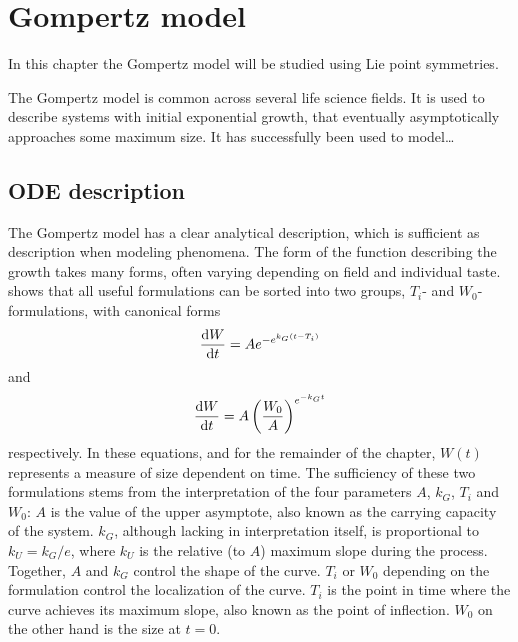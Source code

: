 \chapter{Gompertz model}

In this chapter the Gompertz model will be studied using Lie point symmetries.

The Gompertz model is common across several life science fields.
It is used to describe systems with initial exponential growth, that eventually asymptotically approaches some maximum size.
It has successfully been used to model\dots

\section{ODE description}

The Gompertz model has a clear analytical description, which is sufficient as description when modeling phenomena.
The form of the function describing the growth takes many forms, often varying depending on field and individual taste.
\cite{tjorve2017gompertz} shows that all useful formulations can be sorted into two groups, \(T_i\)- and \(W_0\)-formulations, with canonical forms
\begin{equation}
  \dv{W}{t} = A e^{-e^{k_G(t-T_i)}}
\end{equation}
and
\begin{equation}
  \dv{W}{t} = A \left(\frac{W_0}{A}\right)^{e^{-k_G t}}
\end{equation}
respectively.
In these equations, and for the remainder of the chapter, \(W(t)\) represents a measure of size dependent on time.
The sufficiency of these two formulations stems from the interpretation of the four parameters \(A\), \(k_G\), \(T_i\) and \(W_0\):
\(A\) is the value of the upper asymptote, also known as the carrying capacity of the system.
\(k_G\), although lacking in interpretation itself, is proportional to \(k_U = k_G / e\), where \(k_U\) is the relative (to \(A\)) maximum slope during the process.
Together, \(A\) and \(k_G\) control the shape of the curve.
\(T_i\) or \(W_0\) depending on the formulation control the localization of the curve.
\(T_i\) is the point in time where the curve achieves its maximum slope, also known as the point of inflection.
\(W_0\) on the other hand is the size at \(t=0\).
